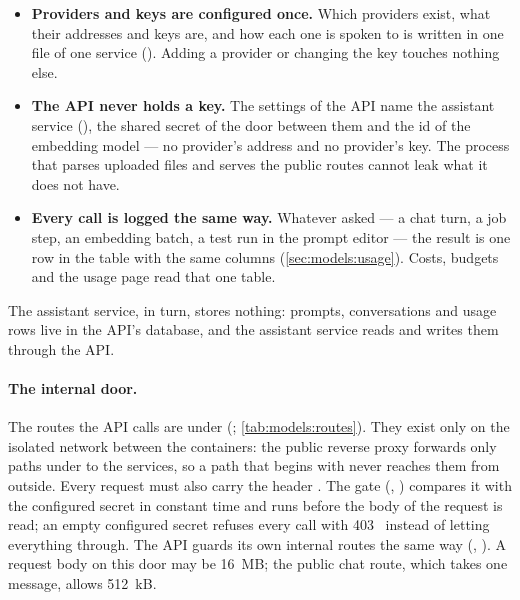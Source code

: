 \begin{itemize}
  \item \textbf{Providers and keys are configured once.} Which providers exist, what their
    addresses and keys are, and how each one is spoken to is written in one file of one
    service (). Adding a provider or changing the key touches nothing
    else.
  \item \textbf{The API never holds a key.} The settings of the API name the assistant
    service (), the shared secret of the door between them and the id of
    the embedding model --- no provider's address and no provider's key. The process that
    parses uploaded files and serves the public routes cannot leak what it does not have.
  \item \textbf{Every call is logged the same way.} Whatever asked --- a chat turn, a job
    step, an embedding batch, a test run in the prompt editor --- the result is one row in the
    table  with the same columns (\cref{sec:models:usage}). Costs, budgets
    and the usage page read that one table.
\end{itemize}

The assistant service, in turn, stores nothing: prompts, conversations and usage rows live in
the API's database, and the assistant service reads and writes them through the API.

\paragraph{The internal door.} The routes the API calls are under 
(; \cref{tab:models:routes}). They exist only on the isolated
network between the containers: the public reverse proxy forwards only paths under
 to the services, so a path that begins with  never reaches them
from outside. Every request must also carry the header .
The gate (, ) compares it with the
configured secret in constant time and runs before the body of the request is read; an empty
configured secret refuses every call with 403~ instead of letting
everything through. The API guards its own internal routes the same way
(, ). A request body on this door
may be 16~MB; the public chat route, which takes one message, allows 512~kB.

